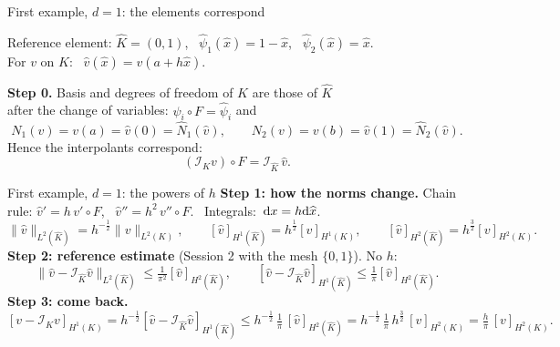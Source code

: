 \begin{frame}{First example, $d = 1$: the elements correspond}
    \begin{center}
    \end{center}
    Reference element: $\widehat K = (0,1)$, \ $\widehat\psi_1(\widehat x) = 1 - \widehat x$, \ $\widehat\psi_2(\widehat x) = \widehat x$.\\ For $v$ on $K$: \ $\widehat v(\widehat x) = v(a + h\widehat x)$.
    \medskip

    \textbf{Step 0.} Basis and degrees of freedom of $K$ are those of $\widehat K$\\ after the change of variables: $\psi_i \circ F = \widehat\psi_i$ and
    \[
        N_1(v) = v(a) = \widehat v(0) = \widehat N_1(\widehat v), \qquad
        N_2(v) = v(b) = \widehat v(1) = \widehat N_2(\widehat v).
    \]
    Hence the interpolants correspond:
    \[
        (\mathcal I_K v)\circ F = \mathcal I_{\widehat K}\, \widehat v .
    \]
\end{frame}

\begin{frame}{First example, $d = 1$: the powers of $h$}
    \small
    \textbf{Step 1: how the norms change.} Chain rule: $\widehat v' = h\, v' \circ F$, \ $\widehat v'' = h^2\, v''\circ F$. \ \mbox{Integrals: ${\mathrm d} x = h {\mathrm d}\widehat x$.}
    \[
        \|\widehat v\|_{L^2(\widehat K)} = h^{-\frac12} \|v\|_{L^2(K)}, \qquad
        [\widehat v]_{H^1(\widehat K)} = h^{\frac12} [v]_{H^1(K)}, \qquad
        [\widehat v]_{H^2(\widehat K)} = h^{\frac32} [v]_{H^2(K)}.
    \]
    \textbf{Step 2: reference estimate} (Session 2 with the mesh $\{0,1\}$). No $h$:
    \[
        \|\widehat v - \mathcal I_{\widehat K}\widehat v\|_{L^2(\widehat K)} \le \tfrac{1}{\pi^2} [\widehat v]_{H^2(\widehat K)}, \qquad
        [\widehat v - \mathcal I_{\widehat K}\widehat v]_{H^1(\widehat K)} \le \tfrac{1}{\pi} [\widehat v]_{H^2(\widehat K)}.
    \]
    \textbf{Step 3: come back.}
    \[
        [v - \mathcal I_K v]_{H^1(K)}
        = h^{-\frac12} [\widehat v - \mathcal I_{\widehat K}\widehat v]_{H^1(\widehat K)}
        \le h^{-\frac12}\, \tfrac1\pi\, [\widehat v]_{H^2(\widehat K)}
        = h^{-\frac12}\, \tfrac1\pi\, h^{\frac32}\, [v]_{H^2(K)}
        = \tfrac h\pi\, [v]_{H^2(K)} .
    \]
\end{frame}


